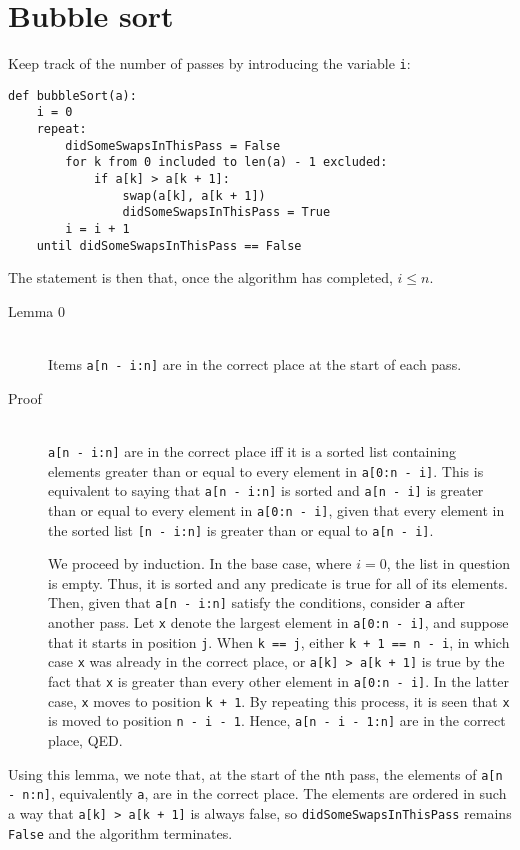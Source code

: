 \documentclass[11pt]{article}
\begin{document}
\begin{minipage}[t]{\linewidth}
  \section{Bubble sort}
  Keep track of the number of passes by introducing the variable \texttt{i}:
  \begin{lstlisting}
def bubbleSort(a):
    i = 0
    repeat:
        didSomeSwapsInThisPass = False
        for k from 0 included to len(a) - 1 excluded:
            if a[k] > a[k + 1]:
                swap(a[k], a[k + 1])
                didSomeSwapsInThisPass = True
        i = i + 1
    until didSomeSwapsInThisPass == False
  \end{lstlisting}
\end{minipage}
The statement is then that, once the algorithm has completed, \(i \leq n\).
\begin{description}
\item[Lemma 0] \hfill \\
  Items \texttt{a[n - i:n]} are in the correct place at the start of each pass.
\item[Proof] \hfill \\
  \texttt{a[n - i:n]} are in the correct place iff it is a sorted list containing elements greater than or equal to every element in \texttt{a[0:n - i]}. This is equivalent to saying that \texttt{a[n - i:n]} is sorted and \texttt{a[n - i]} is greater than or equal to every element in \texttt{a[0:n - i]}, given that every element in the sorted list \texttt{[n - i:n]} is greater than or equal to \texttt{a[n - i]}.

  We proceed by induction. In the base case, where \(i = 0\), the list in question is empty. Thus, it is sorted and any predicate is true for all of its elements. Then, given that \texttt{a[n - i:n]} satisfy the conditions, consider \texttt{a} after another pass. Let \texttt{x} denote the largest element in \texttt{a[0:n - i]}, and suppose that it starts in position \texttt{j}. When \texttt{k == j}, either \texttt{k + 1 == n - i}, in which case \texttt{x} was already in the correct place, or \texttt{a[k] > a[k + 1]} is true by the fact that \texttt{x} is greater than every other element in \texttt{a[0:n - i]}. In the latter case, \texttt{x} moves to position \texttt{k + 1}. By repeating this process, it is seen that \texttt{x} is moved to position \texttt{n - i - 1}. Hence, \texttt{a[n - i - 1:n]} are in the correct place, QED.
\end{description}
Using this lemma, we note that, at the start of the \texttt{n}th pass, the elements of \texttt{a[n - n:n]}, equivalently \texttt{a}, are in the correct place. The elements are ordered in such a way that \texttt{a[k] > a[k + 1]} is always false, so \texttt{didSomeSwapsInThisPass} remains \texttt{False} and the algorithm terminates.
\end{document}
